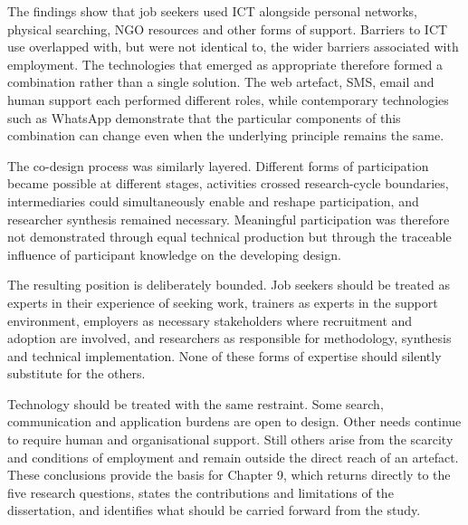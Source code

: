 The findings show that job seekers used ICT alongside personal networks, physical searching, NGO resources and other forms of support. Barriers to ICT use overlapped with, but were not identical to, the wider barriers associated with employment. The technologies that emerged as appropriate therefore formed a combination rather than a single solution. The web artefact, SMS, email and human support each performed different roles, while contemporary technologies such as WhatsApp demonstrate that the particular components of this combination can change even when the underlying principle remains the same.

The co-design process was similarly layered. Different forms of participation became possible at different stages, \tme{} activities crossed research-cycle boundaries, intermediaries could simultaneously enable and reshape participation, and researcher synthesis remained necessary. Meaningful participation was therefore not demonstrated through equal technical production but through the traceable influence of participant knowledge on the developing design.

The resulting position is deliberately bounded. Job seekers should be treated as experts in their experience of seeking work, trainers as experts in the support environment, employers as necessary stakeholders where recruitment and adoption are involved, and researchers as responsible for methodology, synthesis and technical implementation. None of these forms of expertise should silently substitute for the others.

Technology should be treated with the same restraint. Some search, communication and application burdens are open to design. Other needs continue to require human and organisational support. Still others arise from the scarcity and conditions of employment and remain outside the direct reach of an artefact. These conclusions provide the basis for Chapter 9, which returns directly to the five research questions, states the contributions and limitations of the dissertation, and identifies what should be carried forward from the study.